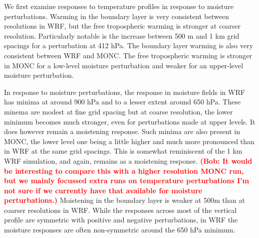 \documentclass[draft]{agujournal2019}
\newcommand{\todo}[1]{\textcolor{red}{\textbf{(#1)}}}
\begin{document}



We first examine responses to temperature profiles in response to moisture
perturbations. Warming in the boundary layer is very consistent between
resolutions in WRF, but the free tropospheric warming is stronger at coarser
resolution. Particularly notable is the increase between 500 m and 1 km grid
spacings for a perturbation at 412 hPa. The boundary layer warming is also very
consistent between WRF and MONC. The free tropospheric warming is stronger in
MONC for a low-level moisture perturbation and weaker for an upper-level
moisture perturbation.

In response to moisture perturbations, the response in moisture fields in WRF
has minima at around 900 hPa and to a lesser extent around 650 hPa. These minema
are modest at fine grid spacing but at coarse resolution, the lower minimum
becomes much stronger, even for perturbations made at upper levels. It does
however remain a moistening response. Such minima are also present in MONC, the
lower level one being a little higher and much more pronounced than in WRF at
the same grid spacings. This is somewhat reminiscent of the 1 km WRF simulation,
and again, remains as a moistening response. \todo{Bob: It would be interesting
to compare this with a higher resolution MONC run, but we mainly focussed extra
runs on temperature perturbations I'm not sure if we currently have that
available for moisture perturbations.} Moistening in the boundary layer is
weaker at 500m than at coarser resolutions in WRF. While the responses across
most of the vertical profile are symmetric with positive and negative
perturbations, in WRF the moisture responses are often non-symmetric around the
650 hPa minimum.
\end{document}
